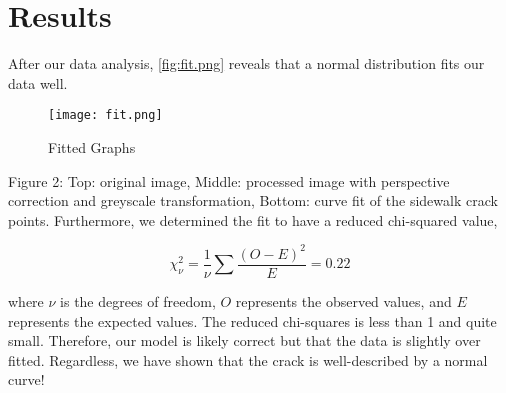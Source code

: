 \documentclass{article}
\begin{document}
\section{Results}
After our data analysis, \autoref{fig:fit.png} reveals that a normal distribution fits our data well.
\begin{figure}[h]
    \centering
    \texttt{[image: fit.png]} 
    \caption{Fitted Graphs}
    \label{fig:fit.png} 
    
\end{figure}

Figure 2: Top: original image, Middle: processed image with perspective correction and greyscale transformation, Bottom: curve fit of the sidewalk crack points.
Furthermore, we determined the fit to have a reduced chi-squared value,

\begin{equation}
\chi^2_\nu = \frac{1}{\nu} \sum \frac{(O - E)^2}{E} =0.22
\end{equation}

where \( \nu \) is the degrees of freedom, \( O \) represents the observed values, and \( E \) represents the expected values.
The reduced chi-squares is less than 1 and quite small. Therefore, our model is likely correct but that the data is slightly over fitted. Regardless, we have shown that the crack is well-described by a normal curve!



\nocite{*}

\cite{ref.bib}
\end{document}
